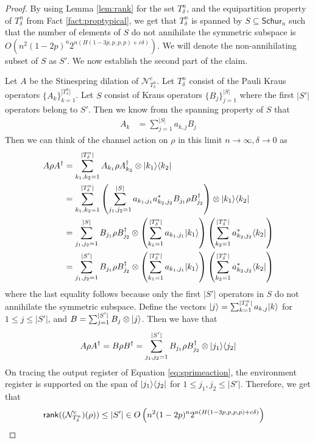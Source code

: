 \documentclass[11pt]{article}
\DeclarePairedDelimiter\bra{\langle}{\rvert}
\DeclarePairedDelimiter\ket{\lvert}{\rangle}
\begin{document}
\begin{proof}
    By using Lemma \ref{lem:rank} for the set $T_{\delta}^n$, and the equipartition property of $T_{\delta}^n$ from Fact \ref{fact:proptypical}, we get that $T_{\delta}^n$ is spanned by $S \subseteq \mathsf{Schur}_n$ such that the number of elements of $S$ do not annihilate the symmetric subspace is $O\left(n^2(1-2p)^n2^{n(H(1-3p, p, p, p)+c\delta)}\right)$. We will denote the non-annihilating subset of $S$ as $S'$. We now establish the second part of the claim.
    

    
    
    Let $A$ be the Stinespring dilation of $\mathcal{N}^{c}_{T^n_\delta}$. Let $T_{\delta}^n$ consist of the Pauli Kraus operators $\{A_k\}_{k = 1}^{|T_{\delta}^n|}$. Let $S$ consist of Kraus operators $\{B_j\}_{j = 1}^{|S|}$ where the first $|S'|$ operators belong to $S'$. Then we know from the spanning property of $S$ that
    \begin{align*}
        A_k &= \sum_{j = 1}^{|S|} a_{k,j} B_j
    \end{align*}
    Then we can think of the channel action on $\rho$ in this limit $n \rightarrow \infty, \delta \rightarrow 0$ as
    \begin{align*}
        A\rho A^{\dagger} &= \sum_{k_1, k_2 = 1}^{|T_{\delta}^n|} A_{k_1} \rho A_{k_2}^{\dagger} \otimes \ket{k_1}\bra{k_2} \\
        &= \sum_{k_1, k_2 = 1}^{|T_{\delta}^n|} \left(\sum_{j_1, j_2 = 1}^{|S|} a_{{k_1}, j_1}a_{k_2,j_2}^{\ast} B_{j_1} \rho B_{j_2}^{\dagger}\right) \otimes \ket{k_1}\bra{k_2} \\
        &= \sum_{j_1, j_2 = 1}^{|S|} B_{j_1} \rho B_{j_2}^{\dagger} \otimes \left(\sum_{k_1 = 1}^{|T_{\delta}^n|} a_{{k_1}, j_1} \ket{k_1}\right)\left(\sum_{k_2 = 1}^{|T_{\delta}^n|} a_{{k_2}, j_2}^{\ast} \bra{k_2}\right) \\
        &= \sum_{j_1, j_2 = 1}^{|S'|} B_{j_1} \rho B_{j_2}^{\dagger} \otimes \left(\sum_{k_1 = 1}^{|T_{\delta}^n|} a_{{k_1}, j_1} \ket{k_1}\right)\left(\sum_{k_2 = 1}^{|T_{\delta}^n|} a_{{k_2}, j_2}^{\ast} \bra{k_2}\right)
    \end{align*}
    where the last equality follows because only the first $|S'|$ operators in $S$ do not annihilate the symmetric subspace. Define the vectors $\ket{j} = \sum_{k = 1}^{|T_{\delta}^n|} a_{{k}, j} \ket{k}$ for $1 \leq j \leq |S'|$, and $B = \sum_{j=1}^{|S'|} B_j \otimes \ket{j}$. Then we have that
    \begin{align}\label{eq:sprimeaction}
        A\rho A^{\dagger} = B \rho B^{\dagger} = \sum_{j_1, j_2 = 1}^{|S'|} B_{j_1} \rho B_{j_2}^{\dagger} \otimes \ket{j_1}\bra{j_2}
    \end{align}
    On tracing the output register of Equation \ref{eq:sprimeaction}, the environment register is supported on the span of $\ket{j_1}\bra{j_2}$ for $1 \leq j_1, j_2 \leq |S'|$. Therefore, we get that
    \begin{align*}
        \mathsf{rank}((\mathcal{N}^c_{T^n_\delta})(\rho)) \leq |S'| \in O\left(n^2(1-2p)^n2^{n(H(1-3p, p, p, p)+c\delta)}\right) &\qedhere
    \end{align*}
\end{proof}
\end{document}
